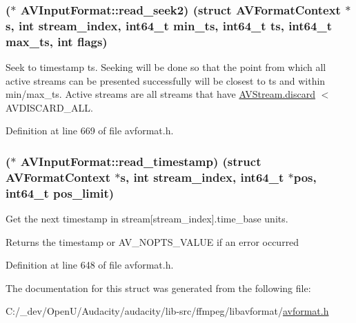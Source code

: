 \subsubsection[{\texorpdfstring{read\+\_\+seek2}{read_seek2}}]{($\ast$ A\+V\+Input\+Format\+::read\+\_\+seek2) (struct {\bf A\+V\+Format\+Context} $\ast${\bf s}, {\bf int} stream\+\_\+index, {\bf int64\+\_\+t} min\+\_\+ts, {\bf int64\+\_\+t} ts, {\bf int64\+\_\+t} max\+\_\+ts, {\bf int} {\bf flags})}\hypertarget{struct_a_v_input_format_abdc6865c444251c21980d8da2e087429}{}\label{struct_a_v_input_format_abdc6865c444251c21980d8da2e087429}
Seek to timestamp ts. Seeking will be done so that the point from which all active streams can be presented successfully will be closest to ts and within min/max\+\_\+ts. Active streams are all streams that have \hyperlink{struct_a_v_stream_a492fcecc45dbbd8da51edd0124e9dd30}{A\+V\+Stream.\+discard} $<$ A\+V\+D\+I\+S\+C\+A\+R\+D\+\_\+\+A\+LL. 

Definition at line 669 of file avformat.\+h.

\subsubsection[{\texorpdfstring{read\+\_\+timestamp}{read_timestamp}}]{($\ast$ A\+V\+Input\+Format\+::read\+\_\+timestamp) (struct {\bf A\+V\+Format\+Context} $\ast${\bf s}, {\bf int} stream\+\_\+index, {\bf int64\+\_\+t} $\ast$pos, {\bf int64\+\_\+t} pos\+\_\+limit)}\hypertarget{struct_a_v_input_format_ab071640466e60eddc4eee43385fb22fd}{}\label{struct_a_v_input_format_ab071640466e60eddc4eee43385fb22fd}
Get the next timestamp in stream\mbox{[}stream\+\_\+index\mbox{]}.time\+\_\+base units. \begin{DoxyReturn}{Returns}
the timestamp or A\+V\+\_\+\+N\+O\+P\+T\+S\+\_\+\+V\+A\+L\+UE if an error occurred 
\end{DoxyReturn}


Definition at line 648 of file avformat.\+h.



The documentation for this struct was generated from the following file\+:\begin{DoxyCompactItemize}
\item 
C\+:/\+\_\+dev/\+Open\+U/\+Audacity/audacity/lib-\/src/ffmpeg/libavformat/\hyperlink{avformat_8h}{avformat.\+h}\end{DoxyCompactItemize}
